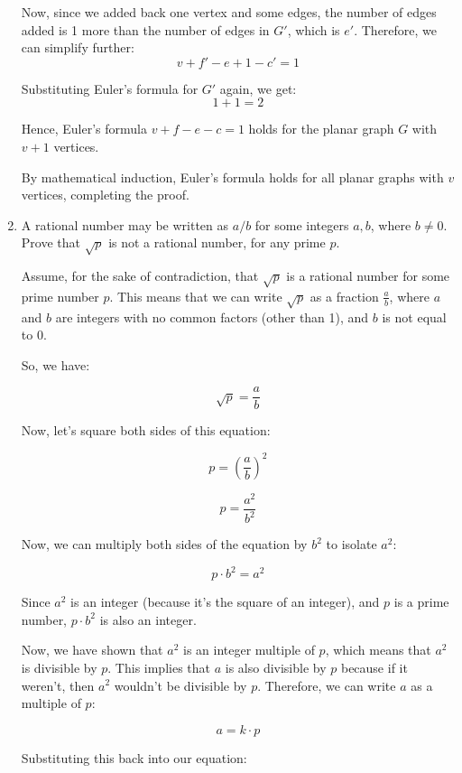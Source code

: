 \documentclass[11pt]{exam}
\begin{document}
\begin{enumerate}
\begin{solution}
Now, since we added back one vertex and some edges, the number of edges added is 1 more than the number of edges in \(G'\), which is \(e'\). Therefore, we can simplify further:
\[v + f' - e + 1 - c' = 1\]

Substituting Euler's formula for \(G'\) again, we get:
\[1 + 1 = 2\]

Hence, Euler's formula \(v + f - e - c = 1\) holds for the planar graph \(G\) with \(v + 1\) vertices.

By mathematical induction, Euler's formula holds for all planar graphs with \(v\) vertices, completing the proof.


    \end{solution}

  \item A rational number may be written as $a/b$ for some integers $a,b$, where $b \neq 0$. Prove that $\sqrt{p}$ is not a rational number, for any prime $p$.

    \begin{solution}

Assume, for the sake of contradiction, that $\sqrt{p}$ is a rational number for some prime number $p$. This means that we can write $\sqrt{p}$ as a fraction $\frac{a}{b}$, where $a$ and $b$ are integers with no common factors (other than 1), and $b$ is not equal to 0.

So, we have:

\[
\sqrt{p} = \frac{a}{b}
\]

Now, let's square both sides of this equation:

\[
p = \left(\frac{a}{b}\right)^2
\]

\[
p = \frac{a^2}{b^2}
\]

Now, we can multiply both sides of the equation by $b^2$ to isolate $a^2$:

\[
p \cdot b^2 = a^2
\]

Since $a^2$ is an integer (because it's the square of an integer), and $p$ is a prime number, $p \cdot b^2$ is also an integer.

Now, we have shown that $a^2$ is an integer multiple of $p$, which means that $a^2$ is divisible by $p$. This implies that $a$ is also divisible by $p$ because if it weren't, then $a^2$ wouldn't be divisible by $p$. Therefore, we can write $a$ as a multiple of $p$:

\[
a = k \cdot p
\]

Substituting this back into our equation:


\end{solution}
\end{enumerate}
\end{document}

